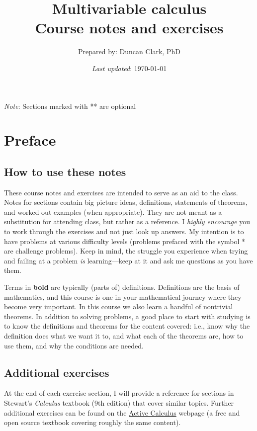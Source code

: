 \documentclass[12pt]{article}
\numberwithin{equation}{subsection}
\numberwithin{figure}{subsection}
\theoremstyle{note}
\begin{document}
\title{ \textbf{Multivariable calculus \\ Course notes and exercises
}}
\author{\small Prepared by: Duncan Clark, PhD}
\date{\small%
\textit{Last updated}: \today}
\maketitle 

{\small
\tableofcontents 

\textit{Note}: Sections marked with ** are optional
\newpage

\section{Preface}


\subsection{How to use these notes} These course notes and exercises are intended to serve as an aid to the class. Notes for sections contain big picture ideas, definitions, statements of theorems, and worked out examples (when appropriate). They are not meant as a substitution for attending class, but rather as a reference. I \textit{highly encourage} you to work through the exercises and not just look up answers. My intention is to have problems at various difficulty levels (problems prefaced with the symbol * are challenge problems). Keep in mind, the struggle you experience when trying and failing at a problem \textit{is} learning---keep at it and ask me questions as you have them. 


Terms in \textbf{bold} are typically (parts of) definitions. Definitions are the basis of mathematics, and this course is one in your mathematical journey where they become very important. In this course we also learn a handful of nontrivial theorems. In addition to solving problems, a good place to start with studying is to know the definitions and theorems for the content covered: i.e., know why the definition does what we want it to, and  what each of the theorems are, how to use them, and why the conditions are needed.


\subsection{Additional exercises}

At the end of each exercise section, I will provide a reference for sections in Stewart's \textit{Calculus} textbook (9th edition) that cover similar topics. Further additional exercises can be found on the \href{https://activecalculus.org/multi/frontmatter.html}{Active Calculus} webpage (a free and open source textbook covering roughly the same content).



}
\end{document}
